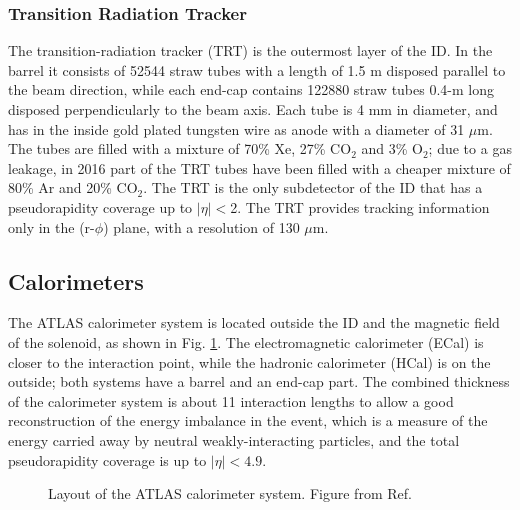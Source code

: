 \subsubsection*{Transition Radiation Tracker}

The transition-radiation tracker (TRT) is the outermost layer of the ID. In the barrel it consists of 52544 straw tubes with a length of 1.5 m disposed parallel to the beam direction, while each end-cap contains 122880 straw tubes 0.4-m long disposed perpendicularly to the beam axis. Each tube is 4 mm in diameter, and has in the inside gold plated tungsten wire as anode with a diameter of 31 $\mu$m. The tubes are filled with a mixture of 70\% Xe, 27\% CO$_2$ and 3\% O$_2$; due to a gas leakage, in 2016 part of the TRT tubes have been filled with a cheaper mixture of 80\% Ar and 20\% CO$_2$. The TRT is the only subdetector of the ID that has a pseudorapidity coverage up to $|\eta|<$2. The TRT provides tracking information only in the (r-$\phi$) plane, with a resolution of 130 $\mu$m.


\subsection{Calorimeters}

The ATLAS calorimeter system is located outside the ID and the magnetic field of the solenoid, as shown in Fig. \ref{fig:atlas:calo}. The electromagnetic calorimeter (ECal) is closer to the interaction point, while the hadronic calorimeter (HCal) is on the outside; both systems have a barrel and an end-cap part. 
The combined thickness of the calorimeter system is about 11 interaction lengths to allow a good reconstruction of the energy imbalance in the event, which is a measure of the energy carried away by neutral weakly-interacting particles, and the total pseudorapidity coverage is up to $|\eta|<4.9$. 

\begin{figure}[ht]
\centering
{}
\caption{Layout of the ATLAS calorimeter system. Figure from Ref. \cite{atlas:atlas}}
\label{fig:atlas:calo}
\end{figure}

